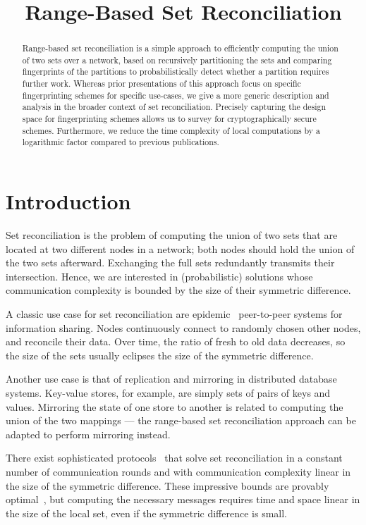 \documentclass[conference]{IEEEtran}
\title{Range-Based Set Reconciliation}
\author{\IEEEauthorblockN{Aljoscha Meyer}
\IEEEauthorblockA{Technical University Berlin\\
Email: research@aljoscha-meyer.de}}
\begin{document}
\maketitle

\begin{abstract}
Range-based set reconciliation is a simple approach to efficiently computing the union of two sets over a network, based on recursively partitioning the sets and comparing fingerprints of the partitions to probabilistically detect whether a partition requires further work. Whereas prior presentations of this approach focus on specific fingerprinting schemes for specific use-cases, we give a more generic description and analysis in the broader context of set reconciliation. Precisely capturing the design space for fingerprinting schemes allows us to survey for cryptographically secure schemes. Furthermore, we reduce the time complexity of local computations by a logarithmic factor compared to previous publications.
\end{abstract}

\section{Introduction}\label{introduction}

Set reconciliation is the problem of computing the union of two sets that are located at two different nodes in a network; both nodes should hold the union of the two sets afterward. Exchanging the full sets redundantly transmits their intersection. Hence, we are interested in (probabilistic) solutions whose communication complexity is bounded by the size of their symmetric difference.

A classic use case for set reconciliation are epidemic~\cite{demers1987epidemic} peer-to-peer systems for information sharing. Nodes continuously connect to randomly chosen other nodes, and reconcile their data. Over time, the ratio of fresh to old data decreases, so the size of the sets usually eclipses the size of the symmetric difference.

Another use case is that of replication and mirroring in distributed database systems. Key-value stores, for example, are simply sets of pairs of keys and values. Mirroring the state of one store to another is related to computing the union of the two mappings --- the range-based set reconciliation approach can be adapted to perform mirroring instead.

There exist sophisticated protocols~\cite{eppstein2011s} that solve set reconciliation in a constant number of communication rounds and with communication complexity linear in the size of the symmetric difference. These impressive bounds are provably optimal~\cite{minsky2003set}, but computing the necessary messages requires time and space linear in the size of the local set, even if the symmetric difference is small.
\end{document}
